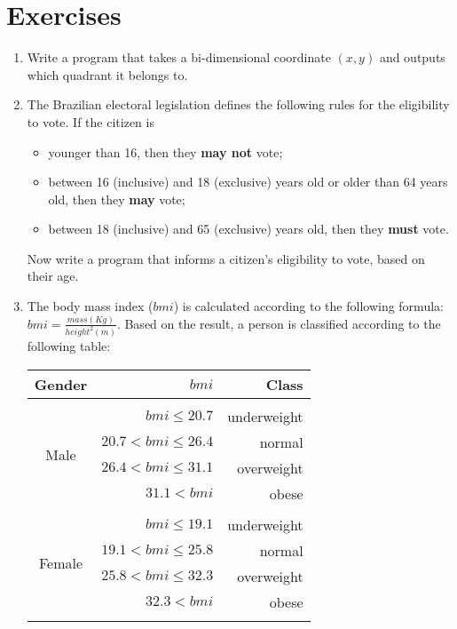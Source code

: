 \documentclass[a4paper]{article}
\begin{document}
	\section{Exercises}
	\begin{enumerate}
		\item Write a program that takes a bi-dimensional coordinate $(x,y)$ and outputs which quadrant it belongs to.
	
		\item The Brazilian electoral legislation defines the following rules for the eligibility to vote. If the citizen is
		\begin{itemize}
			\item younger than 16, then they \textbf{may not} vote;
			\item between 16 (inclusive) and 18 (exclusive) years old or older than 64 years old, then they \textbf{may} vote;
			\item between 18 (inclusive) and 65 (exclusive) years old, then they \textbf{must} vote.
		\end{itemize}
		Now write a program that informs a citizen's eligibility to vote, based on their age.
		
		\item The body mass index ($bmi$) is calculated according to the following formula: $bmi = \frac{mass (Kg)}{height^2 (m)}$. Based on the result, a person is classified according to the following table:
		\begin{table}[h!]
			\centering
			\begin{tabular}{crr}
				Gender 					& $bmi$						& Class \\
				\hline\\
				\multirow{4}{*}{Male}	&	$bmi \le 20.7$			& underweight \\
										&	$20.7 < bmi \le 26.4$	& normal \\
										& 	$26.4 < bmi \le 31.1$	& overweight \\
										&	$31.1 < bmi $			& obese \\
				\hline\\
				\multirow{4}{*}{Female}	&	$bmi \le 19.1$			& underweight \\
										&	$19.1 < bmi \le 25.8$	& normal \\
										& 	$25.8 < bmi \le 32.3$	& overweight \\
										&	$32.3 < bmi $			& obese \\
				\hline\\
			\end{tabular}
		\end{table}
	\end{enumerate}
\end{document}
